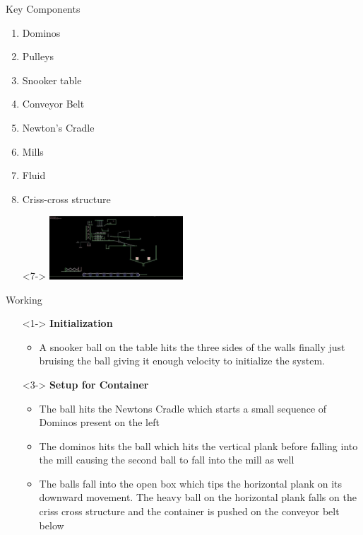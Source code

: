 \documentclass{beamer}
\begin{document}
\begin{frame}{Key Components}
\begin{minipage}[t]{0.48\linewidth}
\begin{enumerate}
\item<1-> Dominos
\item<1-> Pulleys
\item<2-> Snooker table
\item<2->Conveyor Belt
\item<3->Newton's Cradle
\item<4->Mills
\item<5->Fluid
\item<6->Criss-cross structure
\end{enumerate}
\end{minipage}
\begin{minipage}[t]{0.48\linewidth}
\hfill \break
\begin{itemize}
\item[]<7-> \includegraphics[width=5cm]{img/whole}
\end{itemize}
\end{minipage}
\end{frame}
\begin{frame}{Working}
\begin{itemize}[leftmargin=]
\item[]<1-> \textbf{Initialization}
\begin{itemize}
\item<2-> A snooker ball on the table hits the three sides of the walls finally just bruising the ball giving it enough velocity to initialize the system.
\end{itemize}
\item[]<3-> \textbf{Setup for Container}
\begin{itemize}
\item<4-> The ball hits the Newtons Cradle which starts a small sequence of Dominos present on the left
\item<4-> The dominos hits the ball which hits the vertical plank before falling into the mill causing the second ball to fall into the mill as well
\item<5-> The balls fall into the open box which tips the horizontal plank on its downward movement. The heavy ball on the horizontal plank falls on the criss cross structure and the container is pushed on the conveyor belt below
\end{itemize}
\end{itemize}
\end{frame}
\end{document}
